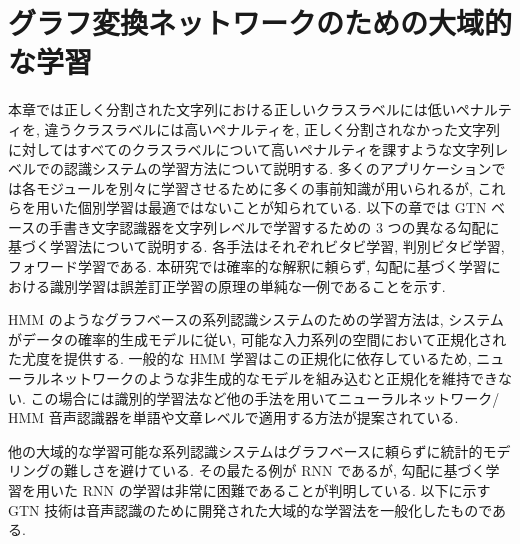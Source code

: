 \documentclass[twocolumn]{jarticle}     %
\begin{document}
\section{グラフ変換ネットワークのための大域的な学習}
本章では正しく分割された文字列における正しいクラスラベルには低いペナルティを, 違うクラスラベルには高いペナルティを, 正しく分割されなかった文字列に対してはすべてのクラスラベルについて高いペナルティを課すような文字列レベルでの認識システムの学習方法について説明する.
多くのアプリケーションでは各モジュールを別々に学習させるために多くの事前知識が用いられるが, これらを用いた個別学習は最適ではないことが知られている. 以下の章では GTN ベースの手書き文字認識器を文字列レベルで学習するための 3 つの異なる勾配に基づく学習法について説明する. 各手法はそれぞれビタビ学習, 判別ビタビ学習, フォワード学習である. 本研究では確率的な解釈に頼らず, 勾配に基づく学習における識別学習は誤差訂正学習の原理の単純な一例であることを示す. 
\par
HMM のようなグラフベースの系列認識システムのための学習方法は, システムがデータの確率的生成モデルに従い, 可能な入力系列の空間において正規化された尤度を提供する. 一般的な HMM 学習はこの正規化に依存しているため, ニューラルネットワークのような非生成的なモデルを組み込むと正規化を維持できない.
この場合には識別的学習法など他の手法を用いてニューラルネットワーク/ HMM 音声認識器を単語や文章レベルで適用する方法が提案されている. 
\par
他の大域的な学習可能な系列認識システムはグラフベースに頼らずに統計的モデリングの難しさを避けている. その最たる例が RNN であるが, 勾配に基づく学習を用いた RNN の学習は非常に困難であることが判明している. 以下に示す GTN 技術は音声認識のために開発された大域的な学習法を一般化したものである.
\end{document}
